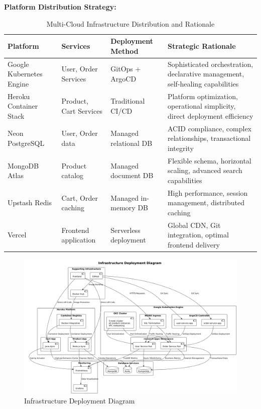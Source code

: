 \textbf{Platform Distribution Strategy:}

\begin{table}[H]
\centering
\caption{Multi-Cloud Infrastructure Distribution and Rationale}
\label{tab:infrastructure-distribution}
\begin{tabular}{|p{3cm}|p{3cm}|p{3cm}|p{5cm}|}
\hline
\textbf{Platform} & \textbf{Services} & \textbf{Deployment Method} & \textbf{Strategic Rationale} \\
\hline
Google Kubernetes Engine & User, Order Services & GitOps + ArgoCD & Sophisticated orchestration, declarative management, self-healing capabilities \\
\hline
Heroku Container Stack & Product, Cart Services & Traditional CI/CD & Platform optimization, operational simplicity, direct deployment efficiency \\
\hline
Neon PostgreSQL & User, Order data & Managed relational DB & ACID compliance, complex relationships, transactional integrity \\
\hline
MongoDB Atlas & Product catalog & Managed document DB & Flexible schema, horizontal scaling, advanced search capabilities \\
\hline
Upstash Redis & Cart, Order caching & Managed in-memory DB & High performance, session management, distributed caching \\
\hline
Vercel & Frontend application & Serverless deployment & Global CDN, Git integration, optimal frontend delivery \\
\hline
\end{tabular}
\end{table}

\begin{figure}[H]
\centering
\includegraphics[width=1.0\textwidth]{figures/Infrastructure-Deployment-Diagram.png}
\caption{Infrastructure Deployment Diagram}
\label{fig:infrastructure-deployment-diagram}
\end{figure}

